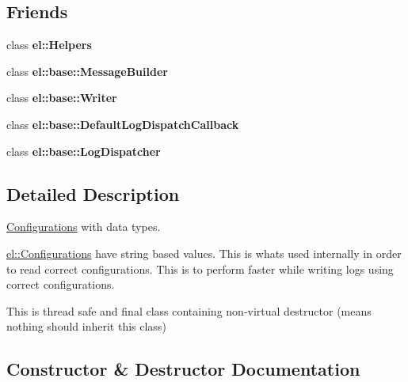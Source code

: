 \subsection*{Friends}
\begin{DoxyCompactItemize}
\item 
\mbox{\label{classel_1_1base_1_1_typed_configurations_a2fb8a2c02cbf86247f093c118bed877a}} 
class {\bfseries el\+::\+Helpers}
\item 
\mbox{\label{classel_1_1base_1_1_typed_configurations_a81bbf6fe31fab133d182efa8367304f1}} 
class {\bfseries el\+::base\+::\+Message\+Builder}
\item 
\mbox{\label{classel_1_1base_1_1_typed_configurations_a7a728edbb2761d151832daa74d5b2736}} 
class {\bfseries el\+::base\+::\+Writer}
\item 
\mbox{\label{classel_1_1base_1_1_typed_configurations_a42b1de96d584ae4fecbfc2b9aff95052}} 
class {\bfseries el\+::base\+::\+Default\+Log\+Dispatch\+Callback}
\item 
\mbox{\label{classel_1_1base_1_1_typed_configurations_a9b37b28ea1c5f8f862cc89f135711d92}} 
class {\bfseries el\+::base\+::\+Log\+Dispatcher}
\end{DoxyCompactItemize}


\subsection{Detailed Description}
\hyperlink{classel_1_1_configurations}{Configurations} with data types. 

\hyperlink{classel_1_1_configurations}{el\+::\+Configurations} have string based values. This is whats used internally in order to read correct configurations. This is to perform faster while writing logs using correct configurations.

This is thread safe and final class containing non-\/virtual destructor (means nothing should inherit this class) 

\subsection{Constructor \& Destructor Documentation}
\mbox{\label{classel_1_1base_1_1_typed_configurations_a1b6d90479bb79da27c3e351a9be593ae}} 
